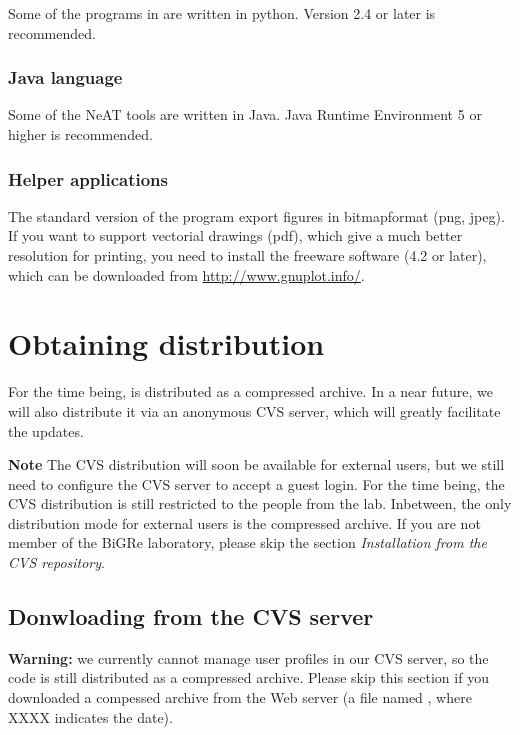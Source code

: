 \documentclass[12pt,a4paper, oneside]{scrreprt} %
\begin{document}
Some of the programs in \RSAT are written in python. Version 2.4 or
later is recommended.

\subsection{Java language}

Some of the NeAT tools are written in Java. Java Runtime Environment 5 or higher is recommended.

\subsection{Helper applications}

The standard version of the program  export figures
in bitmapformat (png, jpeg). If you want to support vectorial drawings
(pdf), which give a much better resolution for printing, you need to
install the freeware software  (4.2 or later), which
can be downloaded from \url{http://www.gnuplot.info/}.



\chapter{Obtaining \RSAT distribution}

For the time being, \RSAT is distributed as a compressed archive. In a
near future, we will also distribute it via an anonymous CVS server,
which will greatly facilitate the updates.

\textbf{Note} The CVS distribution will soon be available for external
users, but we still need to configure the CVS server to accept a guest
login. For the time being, the CVS distribution is still restricted to
the people from the lab. Inbetween, the only distribution mode for
external users is the compressed archive. If you are not member of the
BiGRe laboratory, please skip the section \textit{Installation from
  the CVS repository}.

\section{Donwloading \RSAT from the CVS server}

\textbf{Warning:} we currently cannot manage user profiles in our CVS
server, so the \RSAT code is still distributed as a compressed
archive. Please skip this section if you downloaded a compessed
archive from the Web server (a file named
, where XXXX indicates the date).
\end{document}
